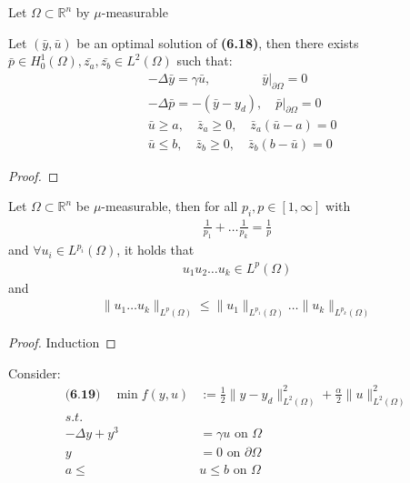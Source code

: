 \begin{lemma}
	Let $\Omega \subset \mathbb{R}^n$ by $\mu$-measurable
\end{lemma}

\begin{theorem}
	Let $(\bar{y}, \bar{u})$ be an optimal solution of \textbf{(6.18)}, then there exists $\bar{p} \in H_0^1(\Omega), \bar{z_a}, \bar{z_b} \in L^2(\Omega)$ such that:
	\begin{align*}
		&-\Delta \bar{y} = \gamma \bar{u},\qquad \qquad \bar{y}|_{\partial\Omega}= 0\\
		&-\Delta \bar{p} = -(\bar{y} - y_d), \quad \bar{p}|_{\partial\Omega} = 0\\
		&\bar{u} \ge a,\quad  \bar{z}_a \ge 0,\quad \bar{z}_a(\bar{u} - a) = 0\\
		&\bar{u} \le b, \quad \bar{z}_b \ge 0, \quad \bar{z}_b(b - \bar{u}) = 0
	\end{align*}
\end{theorem}
\begin{proof}
	
\end{proof}

\begin{lemma}
	Let $\Omega \subset \mathbb{R}^n$ be $\mu$-measurable, then for all $p_i, p \in [1, \infty]$ with 
	\begin{align*}
		\frac{1}{p_1} + \dots \frac{1}{p_k} = \frac{1}{p}
	\end{align*}
	and $\forall u_i \in L^{p_i}(\Omega)$, it holds that 
	\begin{align*}
		u_1 u_2 \dots u_k \in L^p(\Omega)
	\end{align*}
	and 
	\begin{align*}
		\|u_1 \dots u_k \|_{L^p(\Omega)} \le \|u_1\|_{L^{p_1}(\Omega)}\dots\|u_k\|_{L^{p_k}(\Omega)}
	\end{align*}
\end{lemma}
\begin{proof}
	Induction
\end{proof}

\begin{example}
Consider:
\begin{align*}
\textbf{(6.19)} \quad
	\min f(y, u) &:= \frac{1}{2}\|y - y_d\|_{L^2(\Omega)}^2 + \frac{\alpha}{2}\|u\|_{L^2(\Omega)}^2\\
	s.t.\\
	-\Delta y + y^3 &= \gamma u \text{ on } \Omega\\
	y &= 0 \text{ on } \partial \Omega\\
	a \le &u \le b \text{ on } \Omega
\end{align*}	
\end{example}

